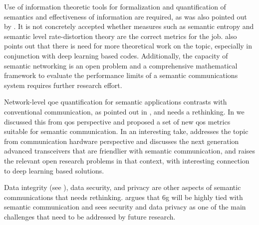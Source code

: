 Use of information theoretic tools for formalization and quantification of semantics and effectiveness of information are required, as was also pointed out by \cite{qin2021semantic}.  %
It is not concretely accepted whether measures such as semantic entropy and semantic level rate-distortion theory are the correct metrics for the job. \cite{luo2022semantic} also points out that there is need for more theoretical work on the topic, especially in conjunction with deep learning based codes. Additionally, the capacity of semantic networking is  an open problem \cite{shi2021semantic} and a comprehensive mathematical framework to evaluate the performance limits of a semantic communications system requires further research effort.

Network-level \gls{qoe} quantification for semantic applications contrasts with conventional communication, as pointed out in \cite{shi2021semantic}, and needs a rethinking. In  we discussed this from \gls{qos} perspective and proposed a set of new \gls{qos} metrics suitable for semantic communication. 
In an interesting take, \cite{you2024next} addresses the topic from communication hardware  perspective and discusses the next generation advanced transceivers that are friendlier with semantic communication, and raises the relevant open research problems in that context, with interesting connection to deep learning based solutions.

Data integrity (see ), data security, and privacy are other aspects of semantic communications that needs rethinking. \cite{getu2024survey} argues that \gls{6g} will be highly tied with semantic communication and sees security and data privacy as one of the main challenges that need to be addressed by future research.

